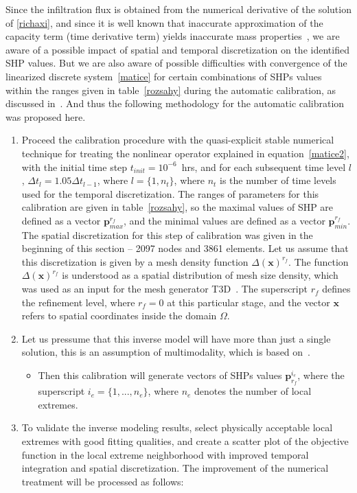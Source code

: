 \documentclass[review]{elsarticle}
\renewcommand{\vec}{\mathbf}
\begin{document}
Since the infiltration flux is obtained from the numerical derivative of the solution of \eqref{richaxi},  and since it is well known that inaccurate approximation of the capacity term (time derivative term) yields inaccurate mass properties~\citep{celia}, we are aware of a possible impact of spatial and temporal discretization on the identified SHP values. But we are also aware of possible difficulties with convergence of the linearized discrete system~\eqref{matice} for certain combinations of SHPs values within the ranges given in table~\ref{rozsahy} during the automatic calibration, as discussed in~\cite{beven2003-uncertain}.
And thus the following methodology for the automatic calibration was proposed here.


 \begin{enumerate}[label=({\bf \roman*})]
\item Proceed the calibration procedure with the quasi-explicit stable numerical technique for treating the nonlinear operator explained in equation~\eqref{matice2}, with the initial time step $t_{init}= 10^{-6}$~hrs, and for each subsequent time level $l$, $\Delta t_l = 1.05 \Delta t_{l-1}$, where $l=\{1,n_t\}$, where $n_t$ is the number of time levels used for the temporal discretization. The ranges of parameters for this calibration are given in table~\ref{rozsahy}, so the maximal values of SHP are defined as a vector $\vec{p}^{r_f}_{max}$, and the minimal values are defined as a vector $\vec{p}^{r_f}_{min}$. The spatial discretization for this step of calibration was given in the beginning of this section -- 2097 nodes and 3861 elements. 
Let us assume that this discretization is given by a mesh density function ${\Delta}(\vec{x})^{r_f}$. The function $\Delta(\vec{x})^{r_f}$ is understood as a spatial distribution of mesh size density, which was used as an input for the mesh generator T3D~\citep{t3d}. The superscript $r_f$ defines the refinement level, where $r_f=0$ at this particular stage, and the vector $\vec{x}$ refers to spatial coordinates inside the domain $\Omega$.
\item Let us pressume that this inverse model will have more than just a single solution, this is an assumption of multimodality, which is based on~\citep{beven2003-uncertain}. \begin{itemize} \item Then this calibration will generate vectors of SHPs values $\vec{p}^{i_e}_{r_f}$, where the superscript $i_e=\{1,...,n_e\}$, where $n_e$     denotes the number of  local extremes. \end{itemize} 
\item To validate the inverse modeling results, select physically acceptable local extremes with good fitting qualities, and create a scatter plot of the objective function in the local extreme  neighborhood  with improved temporal integration and spatial discretization. The improvement of the numerical treatment will be processed as follows:


\end{enumerate}
\end{document}

